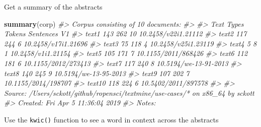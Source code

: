 \documentclass[author-year, review, 11pt]{components/elsarticle} %
\newenvironment{Shaded}{\begin{snugshade}}{\end{snugshade}}
\newcommand{\CommentTok}[1]{\textcolor[rgb]{0.56,0.35,0.01}{\textit{#1}}}
\newcommand{\KeywordTok}[1]{\textcolor[rgb]{0.13,0.29,0.53}{\textbf{#1}}}
\newcommand{\NormalTok}[1]{#1}
\begin{document}
Get a summary of the abstracts

\begin{Shaded}
\begin{Highlighting}[]
\KeywordTok{summary}\NormalTok{(corp)}
\CommentTok{#> Corpus consisting of 10 documents:}
\CommentTok{#> }
\CommentTok{#>    Text Types Tokens Sentences                    V1}
\CommentTok{#>   text1   143    262        10   10.2458/v22i1.21112}
\CommentTok{#>   text2   117    244         6   10.2458/v17i1.21696}
\CommentTok{#>   text3    75    118         4   10.2458/v25i1.23119}
\CommentTok{#>   text4     5      8         1    10.2458/v1i1.21154}
\CommentTok{#>   text5   105    171         7   10.1155/2011/868426}
\CommentTok{#>   text6   112    181         6   10.1155/2012/273413}
\CommentTok{#>   text7   117    240         8 10.5194/we-13-91-2013}
\CommentTok{#>   text8   140    245         9 10.5194/we-13-95-2013}
\CommentTok{#>   text9   107    202         7   10.1155/2014/198707}
\CommentTok{#>  text10   118    224         6   10.5402/2011/897578}
\CommentTok{#> }
\CommentTok{#> Source: /Users/sckott/github/ropensci/textmine/use-cases/* on x86_64 by sckott}
\CommentTok{#> Created: Fri Apr  5 11:36:04 2019}
\CommentTok{#> Notes:}
\end{Highlighting}
\end{Shaded}

Use the \texttt{kwic()} function to see a word in context across the
abstracts
\end{document}
